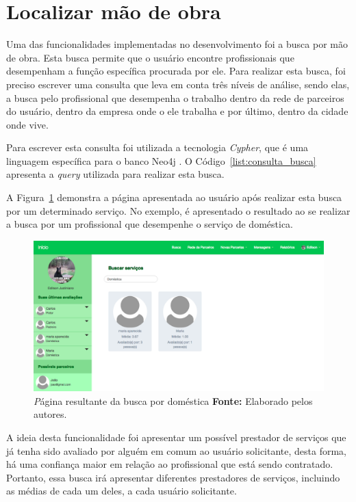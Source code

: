 \section{Localizar mão de obra}

\par Uma das funcionalidades implementadas no desenvolvimento foi a busca por mão de obra. Esta busca permite que o usuário encontre profissionais que desempenham a função específica procurada por ele. Para realizar esta busca, foi preciso escrever uma consulta que leva em conta três níveis de análise, sendo elas, a busca pelo profissional que desempenha o trabalho dentro da rede de parceiros do usuário, dentro da empresa onde o ele trabalha e por último, dentro da cidade onde vive.  

\par Para escrever esta consulta foi utilizada a tecnologia \textit{Cypher}, que é uma linguagem específica para o banco Neo4j \cite{neo4j_team_manual}. O Código~\ref{list:consulta_busca} apresenta a \textit{query} utilizada para realizar esta busca.

\par A Figura~\ref{fig:busca_domestica_edilson} demonstra a página apresentada ao usuário após realizar esta busca por um determinado serviço. No exemplo, é apresentado o resultado ao se realizar a busca por um profissional que desempenhe o serviço de doméstica.

\begin{figure}[h!]
	\centerline{\includegraphics[scale=0.3]{./imagens/busca-domestica-edilson.png}}
	\caption[\textit Página resultante da busca por doméstica.]
	{\textit Página resultante da busca por doméstica \textbf{Fonte:} Elaborado pelos autores.}
	\label{fig:busca_domestica_edilson}
\end{figure}

\par A ideia desta funcionalidade foi apresentar um possível prestador de serviços que já tenha sido avaliado por alguém em comum ao usuário solicitante, desta forma, há uma confiança maior em relação ao profissional que está sendo contratado. Portanto, essa busca irá apresentar diferentes prestadores de serviços, incluindo as médias de cada um deles, a cada usuário solicitante.

